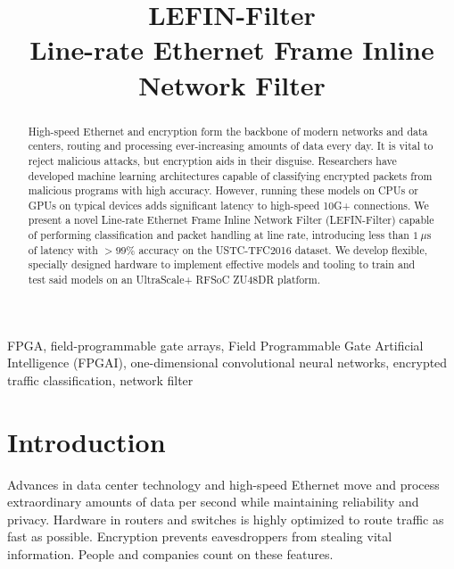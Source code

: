 \documentclass[conference]{IEEEtran}
\begin{document}
\title{LEFIN-Filter\\
{\Large Line-rate Ethernet Frame Inline Network Filter}
}

\author{
    \and
}

\maketitle

\begin{abstract}
    High-speed Ethernet and encryption form the backbone of modern networks and data centers, routing and processing ever-increasing amounts of data every day. It is vital to reject malicious attacks, but encryption aids in their disguise. Researchers have developed machine learning architectures capable of classifying encrypted packets from malicious programs with high accuracy. However, running these models on CPUs or GPUs on typical devices adds significant latency to high-speed 10G+ connections. We present a novel Line-rate Ethernet Frame Inline Network Filter (LEFIN-Filter) capable of performing classification and packet handling at line rate, introducing less than $1~\mu\text{s}$ of latency with $>99\%$ accuracy on the USTC-TFC2016 dataset. We develop flexible, specially designed hardware to implement effective models and tooling to train and test said models on an UltraScale+ RFSoC ZU48DR platform.
\end{abstract}

\begin{IEEEkeywords}
    FPGA, field-programmable gate arrays, Field Programmable Gate Artificial Intelligence (FPGAI), one-dimensional convolutional neural networks, encrypted traffic classification, network filter
\end{IEEEkeywords}

\section{Introduction}
Advances in data center technology and high-speed Ethernet move and process extraordinary amounts of data per second while maintaining reliability and privacy. Hardware in routers and switches is highly optimized to route traffic as fast as possible. Encryption prevents eavesdroppers from stealing vital information. People and companies count on these features.
\end{document}
